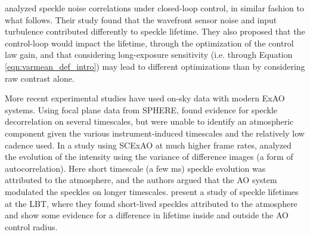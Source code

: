 \documentclass[10pt,preprint]{aastex631}
\begin{document}
\citet{2006OExpr..14.7499P} analyzed speckle noise correlations under closed-loop control, in similar fashion to what follows.  Their study found that the wavefront sensor noise and input turbulence contributed differently to speckle lifetime.  They also proposed that the control-loop would impact the lifetime, through the optimization of the control law gain, and that considering long-exposure sensitivity (i.e. through Equation \ref{eqn:varmean_def_intro}) may lead to different optimizations than by considering raw contrast alone. 

More recent experimental studies have used on-sky data with modern ExAO systems.  Using focal plane data from SPHERE, \citet{2016SPIE.9909E..4ZM} found evidence for speckle decorrelation on several timescales, but were unable to identify an atmospheric component given the various instrument-induced timescales and the relatively low cadence used. In a study using SCExAO at much higher frame rates, \citet{2018PASP..130j4502G} analyzed the evolution of the intensity using the variance of difference images (a form of autocorrelation).  Here short timescale (a few ms) speckle evolution was attributed to the atmosphere, and the authors argued that the AO system modulated the speckles on longer timescales.  \citet{2017JATIS...3b5001S} present a study of speckle lifetimes at the LBT, where they found short-lived speckles attributed to the atmosphere and show some evidence for a difference in lifetime inside and outside the AO control radius.
\end{document}
